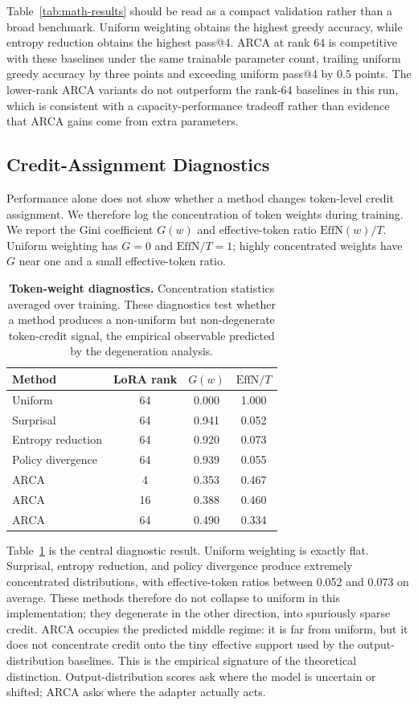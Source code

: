 Table~\ref{tab:math-results} should be read as a compact validation rather
than a broad benchmark. Uniform weighting obtains the highest greedy
accuracy, while entropy reduction obtains the highest pass@4. ARCA at rank
64 is competitive with these baselines under the same trainable parameter
count, trailing uniform greedy accuracy by three points and exceeding uniform
pass@4 by 0.5 points. The lower-rank ARCA variants do not outperform the
rank-64 baselines in this run, which is consistent with a capacity-performance
tradeoff rather than evidence that ARCA gains come from extra parameters.

\subsection{Credit-Assignment Diagnostics}

Performance alone does not show whether a method changes token-level credit
assignment. We therefore log the concentration of token weights during
training. We report the Gini coefficient $G(w)$ and effective-token ratio
$\mathrm{EffN}(w)/T$. Uniform weighting has $G=0$ and
$\mathrm{EffN}/T=1$; highly concentrated weights have $G$ near one and a
small effective-token ratio.

\begin{table}[t]
\centering
\caption{\textbf{Token-weight diagnostics.} Concentration statistics
averaged over training. These diagnostics test whether a method produces a
non-uniform but non-degenerate token-credit signal, the empirical observable
predicted by the degeneration analysis.}
\label{tab:weight-diagnostics}
\begin{tabular}{l c c c}
\toprule
Method & LoRA rank & $G(w)$ & $\mathrm{EffN}/T$ \\
\midrule
Uniform & 64 & 0.000 & 1.000 \\
Surprisal & 64 & 0.941 & 0.052 \\
Entropy reduction & 64 & 0.920 & 0.073 \\
Policy divergence & 64 & 0.939 & 0.055 \\
ARCA & 4 & 0.353 & 0.467 \\
ARCA & 16 & 0.388 & 0.460 \\
ARCA & 64 & 0.490 & 0.334 \\
\bottomrule
\end{tabular}
\end{table}

Table~\ref{tab:weight-diagnostics} is the central diagnostic result. Uniform
weighting is exactly flat. Surprisal, entropy reduction, and policy divergence
produce extremely concentrated distributions, with effective-token ratios
between 0.052 and 0.073 on average. These methods therefore do not collapse to
uniform in this implementation; they degenerate in the other direction, into
spuriously sparse credit. ARCA occupies the predicted middle regime: it is far
from uniform, but it does not concentrate credit onto the tiny effective
support used by the output-distribution baselines. This is the empirical
signature of the theoretical distinction. Output-distribution scores ask
where the model is uncertain or shifted; ARCA asks where the adapter actually
acts.

